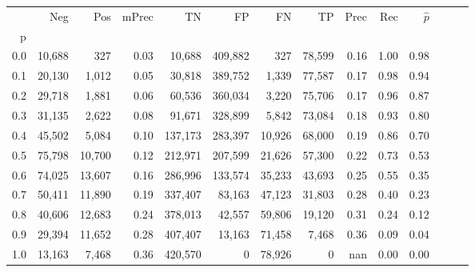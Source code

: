 \begin{tabular}{rrrrrrrrrrrrrr}
\toprule
{} &     Neg &     Pos & mPrec &       TN &       FP &      FN &      TP &  Prec &   Rec & $\hat{p}$ \\
p   &         &         &       &          &          &         &         &       &       &           \\
\midrule
0.0 &  10,688 &     327 &  0.03 &   10,688 &  409,882 &     327 &  78,599 &  0.16 &  1.00 &      0.98 \\
0.1 &  20,130 &   1,012 &  0.05 &   30,818 &  389,752 &   1,339 &  77,587 &  0.17 &  0.98 &      0.94 \\
0.2 &  29,718 &   1,881 &  0.06 &   60,536 &  360,034 &   3,220 &  75,706 &  0.17 &  0.96 &      0.87 \\
0.3 &  31,135 &   2,622 &  0.08 &   91,671 &  328,899 &   5,842 &  73,084 &  0.18 &  0.93 &      0.80 \\
0.4 &  45,502 &   5,084 &  0.10 &  137,173 &  283,397 &  10,926 &  68,000 &  0.19 &  0.86 &      0.70 \\
0.5 &  75,798 &  10,700 &  0.12 &  212,971 &  207,599 &  21,626 &  57,300 &  0.22 &  0.73 &      0.53 \\
0.6 &  74,025 &  13,607 &  0.16 &  286,996 &  133,574 &  35,233 &  43,693 &  0.25 &  0.55 &      0.35 \\
0.7 &  50,411 &  11,890 &  0.19 &  337,407 &   83,163 &  47,123 &  31,803 &  0.28 &  0.40 &      0.23 \\
0.8 &  40,606 &  12,683 &  0.24 &  378,013 &   42,557 &  59,806 &  19,120 &  0.31 &  0.24 &      0.12 \\
0.9 &  29,394 &  11,652 &  0.28 &  407,407 &   13,163 &  71,458 &   7,468 &  0.36 &  0.09 &      0.04 \\
1.0 &  13,163 &   7,468 &  0.36 &  420,570 &        0 &  78,926 &       0 &   nan &  0.00 &      0.00 \\
\bottomrule
\end{tabular}
